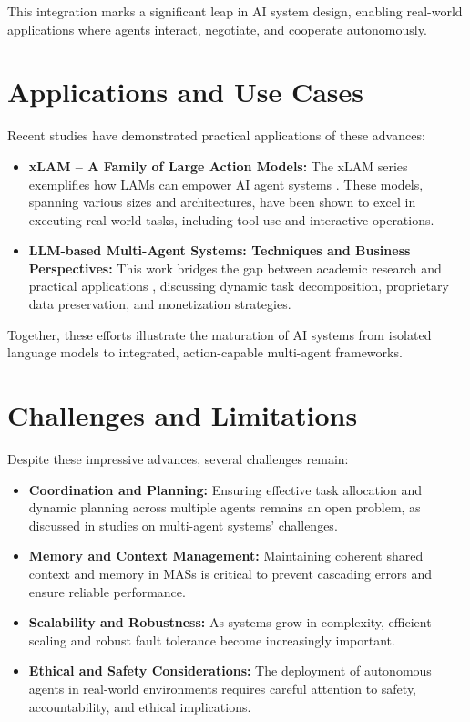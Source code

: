 \documentclass[journal,twoside,10pt]{IEEEtran}
\begin{document}
This integration marks a significant leap in AI system design, enabling real-world applications where agents interact, negotiate, and cooperate autonomously.

\section{Applications and Use Cases}
Recent studies have demonstrated practical applications of these advances:

\begin{itemize}
    \item \textbf{xLAM – A Family of Large Action Models:} The xLAM series exemplifies how LAMs can empower AI agent systems \cite{xlam2024}. These models, spanning various sizes and architectures, have been shown to excel in executing real-world tasks, including tool use and interactive operations.
    \item \textbf{LLM-based Multi-Agent Systems: Techniques and Business Perspectives:} This work bridges the gap between academic research and practical applications \cite{mas_business2023}, discussing dynamic task decomposition, proprietary data preservation, and monetization strategies.
\end{itemize}

Together, these efforts illustrate the maturation of AI systems from isolated language models to integrated, action-capable multi-agent frameworks.

\section{Challenges and Limitations}
Despite these impressive advances, several challenges remain:

\begin{itemize}
    \item \textbf{Coordination and Planning:} Ensuring effective task allocation and dynamic planning across multiple agents remains an open problem, as discussed in studies on multi-agent systems' challenges.
    \item \textbf{Memory and Context Management:} Maintaining coherent shared context and memory in MASs is critical to prevent cascading errors and ensure reliable performance.
    \item \textbf{Scalability and Robustness:} As systems grow in complexity, efficient scaling and robust fault tolerance become increasingly important.
    \item \textbf{Ethical and Safety Considerations:} The deployment of autonomous agents in real-world environments requires careful attention to safety, accountability, and ethical implications.
\end{itemize}
\end{document}
